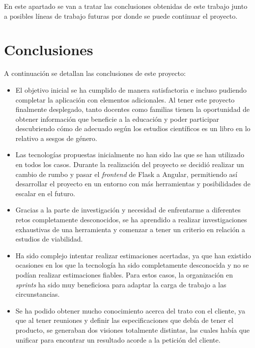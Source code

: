 
En este apartado se van a tratar las conclusiones obtenidas de este trabajo junto a posibles líneas de trabajo futuras por donde se puede continuar el proyecto.

\section{Conclusiones}
A continuación se detallan las conclusiones de este proyecto:
\begin{itemize}
    \item El objetivo inicial se ha cumplido de manera satisfactoria e incluso pudiendo completar la aplicación con elementos adicionales. Al tener este proyecto finalmente desplegado, tanto docentes como familias tienen la oportunidad de obtener información que beneficie a la educación y poder participar descubriendo cómo de adecuado según los estudios científicos es un libro en lo relativo a sesgos de género.
    \item Las tecnologías propuestas inicialmente no han sido las que se han utilizado en todos los casos. Durante la realización del proyecto se decidió realizar un cambio de rumbo y pasar el \textit{frontend} de Flask a Angular, permitiendo así desarrollar el proyecto en un entorno con más herramientas y posibilidades de escalar en el futuro.
    \item Gracias a la parte de investigación y necesidad de enfrentarme a diferentes retos completamente desconocidos, se ha aprendido a realizar investigaciones exhaustivas de una herramienta y comenzar a tener un criterio en relación a estudios de viabilidad.
    \item Ha sido complejo intentar realizar estimaciones acertadas, ya que han existido ocasiones en los que la tecnología ha sido completamente desconocida y no se podían realizar estimaciones fiables. Para estos casos, la organización en \textit{sprints} ha sido muy beneficiosa para adaptar la carga de trabajo a las circunstancias.
    \item Se ha podido obtener mucho conocimiento acerca del trato con el cliente, ya que al tener reuniones y definir las especificaciones que debía de tener el producto, se generaban dos visiones totalmente distintas, las cuales había que unificar para encontrar un resultado acorde a la petición del cliente.
\end{itemize}

